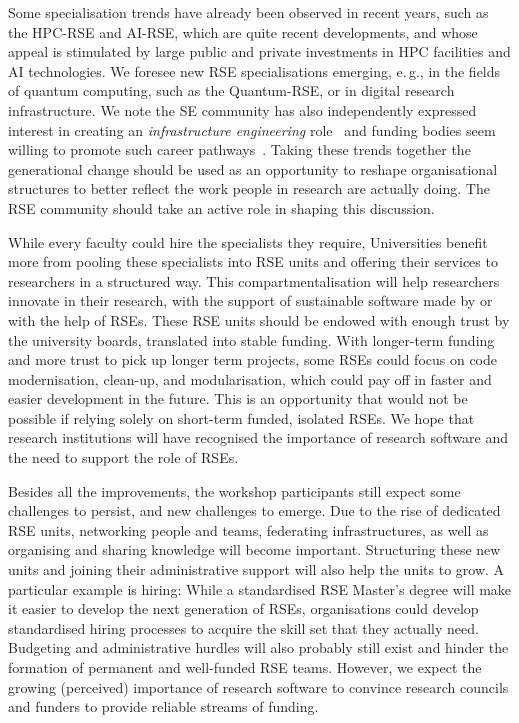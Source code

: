 \documentclass{eceasst}
\newcommand{\eg}{e.\,g.}
\begin{document}
Some specialisation trends have already been observed in recent years,
such as the HPC-RSE and AI-RSE, which are quite recent developments,
and whose appeal is stimulated by large public and private investments in HPC facilities and AI technologies.
We foresee new RSE specialisations emerging, \eg, in the fields of quantum computing,
such as the Quantum-RSE, or in digital research infrastructure.
We note the SE community has also independently expressed interest in creating an \emph{infrastructure engineering} role~\cite{Sochat2024Infra}
and funding bodies seem willing to promote such career pathways~\cite{UKRI2025Infra,EuroHPC2024Federated}.
Taking these trends together the generational change should be used as an opportunity to reshape organisational structures to better reflect the work people in research
are actually doing. The RSE community should take an active role in shaping this discussion.

While every faculty could hire the specialists they require,
Universities benefit more from pooling these specialists into RSE units
and offering their services to researchers in a structured way.
This compartmentalisation will help researchers innovate in their research,
with the support of sustainable software made by or with the help of RSEs.
These RSE units should be endowed with enough trust by the university boards, translated into stable funding.
With longer-term funding and more trust to pick up longer term projects,
some RSEs could focus on code modernisation, clean-up, and modularisation,
which could pay off in faster and easier development in the future.
This is an opportunity that would not be possible if relying solely on short-term funded, isolated RSEs.
We hope that research institutions will have recognised the importance of research software and the need to support the role of RSEs. 

Besides all the improvements, the workshop participants still expect some challenges to persist,
and new challenges to emerge.
Due to the rise of dedicated RSE units, networking people and teams,
federating infrastructures, as well as organising and sharing knowledge will become important.
Structuring these new units and joining their administrative support will also help the units to grow.
A particular example is hiring:
While a standardised RSE Master's degree will make it easier to develop the next generation of RSEs,
organisations could develop standardised hiring processes to acquire the skill set that they actually need.
Budgeting and administrative hurdles will also probably still exist and hinder the formation of permanent and well-funded RSE teams.
However, we expect the growing (perceived) importance of research software
to convince research councils and funders to provide reliable streams of funding.
\end{document}
